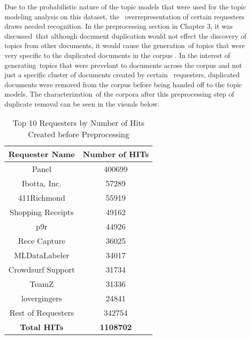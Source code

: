 \documentclass[letterpaper,12pt]{article}
\begin{document}
Due to the probabilistic nature of the topic models that were used for the topic modeling analysis on this dataset, the \
overrepresentation of certain requesters draws needed recognition. In the preprocessing section in Chapter 3, it was discussed\
that although document duplication would not effect the discovery of topics from other documents, it would cause the generation\
of topics that were very specific to the duplicated documents in the corpus \cite{schofieldunderstanding}. In the interest of generating\
topics that were prevelant to documents across the corpus and not just a specific cluster of documents created by certain \
requesters, duplicated documents were removed from the corpus before being handed off to the topic models. The characterization\
of the corpora after this preprocessing step of duplicate removal can be seen in the visuals below.

\begin{table}
	\caption{\label{tab:requester_top_10} Top 10 Requesters by Number of Hits Created before Preprocessing}
	\begin{center}
		\begin{tabular}{| c | c |}
			\hline
			\textbf{Requester Name} & \textbf{Number of HITs} \\
			\hline
			Panel              &          400699 \\
			\hline
			Ibotta, Inc.       &           57289 \\
			\hline
			411Richmond        &           55919 \\
			\hline
			Shopping Receipts  &           49162 \\
			\hline
			p9r                &           44926 \\
			\hline
			Rece Capture       &           36025 \\
			\hline
			MLDataLabeler      &           34017 \\
			\hline
			Crowdsurf Support  &           31734 \\
			\hline
			TeamZ              &           31336 \\
			\hline
			lovergingers       &           24841 \\
			\hline
			Rest of Requesters &          342754 \\
			\hline
			\textbf{Total HITs} & \textbf{1108702} \\
			\hline
			\end{tabular}
	\end{center}
\end{table}
\end{document}
